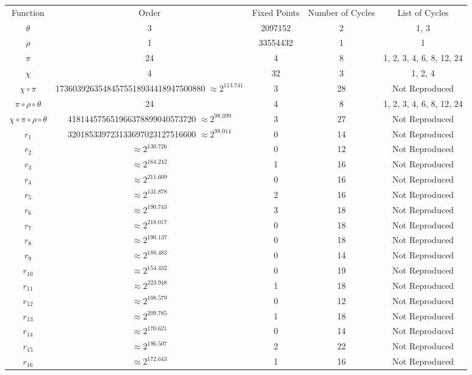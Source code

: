 \documentclass[10pt,twocolumn,twoside]{pnas-new}
\begin{document}
\begin{tabular}{c c c c c} \label{tab:p:c:1}
    Function & Order & Fixed Points & Number of Cycles & List of Cycles \\
    $\theta$ & 3 & 2097152 & 2 & 1, 3 \\
    $\rho$ & 1 & 33554432 & 1 & 1 \\
    $\pi$ & 24 & 4 & 8 & 1, 2, 3, 4, 6, 8, 12, 24 \\
    $\chi$ & 4 & 32 & 3 & 1, 2, 4 \\
    $\chi \circ \pi$ & 17360392635484575518934418947500880 $\approx 2^{113.741}$ & 3 & 28 & Not Reproduced \\
    $\pi \circ \rho \circ \theta$ & 24 & 4 & 8 & 1, 2, 3, 4, 6, 8, 12, 24 \\
    $\chi \circ \pi \circ \rho \circ \theta$ & 418144575651966378899040573720 $\approx 2^{98.399}$ & 3 & 27 & Not Reproduced \\
    $r_1$ & 320185339723133697023127516600 $\approx 2^{98.014}$ & 0 & 14 & Not Reproduced \\
    $r_2$ & $\approx 2^{130.726}$ & 0 & 12 & Not Reproduced \\
    $r_3$ & $\approx 2^{164.242}$ & 1 & 16 & Not Reproduced \\
    $r_4$ & $\approx 2^{211.609}$ & 0 & 16 & Not Reproduced \\
    $r_5$ & $\approx 2^{131.878}$ & 2 & 16 & Not Reproduced \\
    $r_6$ & $\approx 2^{190.743}$ & 3 & 18 & Not Reproduced \\
    $r_7$ & $\approx 2^{218.017}$ & 0 & 18 & Not Reproduced \\
    $r_8$ & $\approx 2^{190.137}$ & 0 & 18 & Not Reproduced \\
    $r_9$ & $\approx 2^{188.483}$ & 0 & 14 & Not Reproduced \\
    $r_{10}$ & $\approx 2^{154.432}$ & 0 & 19 & Not Reproduced \\
    $r_{11}$ & $\approx 2^{223.948}$ & 1 & 18 & Not Reproduced \\
    $r_{12}$ & $\approx 2^{108.579}$ & 0 & 12 & Not Reproduced \\
    $r_{13}$ & $\approx 2^{209.785}$ & 1 & 18 & Not Reproduced \\
    $r_{14}$ & $\approx 2^{170.621}$ & 0 & 14 & Not Reproduced \\
    $r_{15}$ & $\approx 2^{196.507}$ & 2 & 22 & Not Reproduced \\
    $r_{16}$ & $\approx 2^{172.643}$ & 1 & 16 & Not Reproduced \\

\end{tabular}
\end{document}
